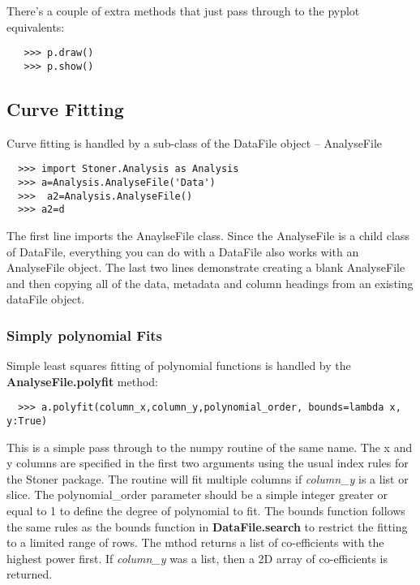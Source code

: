 \documentclass[a4paper,11pt]{scrartcl}
\begin{document}
 There's a couple of extra methods that just pass through to the pyplot equivalents:

 \begin{verbatim}
   >>> p.draw()
   >>> p.show()
 \end{verbatim}


\subsection{Curve Fitting}

Curve fitting is handled by a sub-class of the DataFile object -- AnalyseFile

\begin{verbatim}
  >>> import Stoner.Analysis as Analysis
  >>> a=Analysis.AnalyseFile('Data')
  >>>  a2=Analysis.AnalyseFile()
  >>> a2=d
\end{verbatim}

The first line imports the AnaylseFile class. Since the AnalyseFile is a child
class of DataFile, everything you can do with a DataFile also works with an
AnalyseFile object. The last two lines demonstrate creating a blank AnalyseFile
and then copying all of the data, metadata and column headings from an existing
dataFile object.

\subsubsection{Simply polynomial Fits}

Simple least squares fitting of polynomial functions is handled by the
\textbf{AnalyseFile.polyfit} method:

\begin{verbatim}
  >>> a.polyfit(column_x,column_y,polynomial_order, bounds=lambda x, y:True)
\end{verbatim}

This is a simple pass through to the numpy routine of the same name. The x and y
columns are specified in the first two arguments using the usual index rules for
the Stoner package. The routine will fit multiple columns if \textit{column\_y}
is a list or slice. The polynomial\_order parameter should be a simple integer
greater or equal to 1 to define the degree of polynomial to fit. The bounds
function follows the same rules as the bounds function in
\textbf{DataFile.search} to restrict the fitting to a limited range of rows. The
mthod returns a list of co-efficients with the highest power first. If
\textit{column\_y} was a list, then a 2D array of co-efficients is returned.
\end{document}
